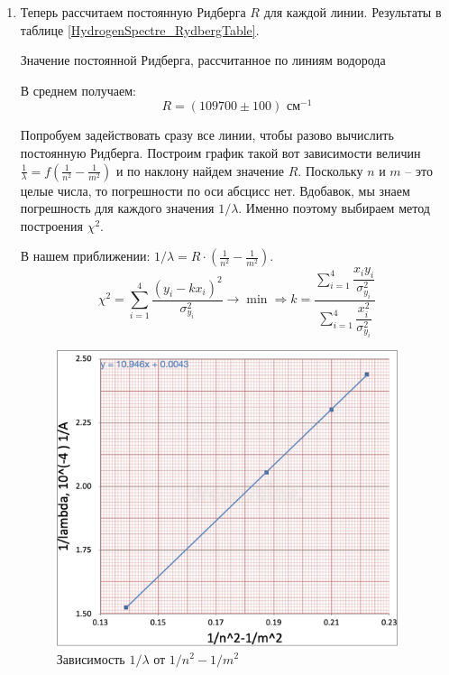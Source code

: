 \documentclass[12pt,a4paper]{article}
\begin{document}
\begin{enumerate}
	\item Теперь рассчитаем постоянную Ридберга $R$ для каждой линии. Результаты в таблице \ref{HydrogenSpectre_RydbergTable}.

     \begin{table}[h!]
       \centering
       \footnotesize
       
       \caption{Значение постоянной Ридберга, рассчитанное по линиям водорода}
       \label{HydrogenSpectre_RydbergTable}
    \end{table}
	
	В среднем получаем:
	\begin{equation*}
		\boxed{R = (109700 \pm 100) \text{ см}^{-1}}  \iffalse 117 \fi
	\end{equation*}

	Попробуем задействовать сразу все линии, чтобы разово вычислить постоянную Ридберга.
	Построим график такой вот зависимости величин $\frac{1}{\lambda} = f\left(\frac{1}{n^2} - \frac{1}{m^2}\right)$ и по наклону найдем значение $R$. Поскольку $n$ и $m$ -- это целые числа, то погрешности по оси абсцисс нет. Вдобавок, мы знаем погрешность для каждого значения $1/\lambda$. Именно поэтому выбираем метод построения $\chi^2$.

	В нашем приближении: $1/\lambda = R \cdot \left(\frac{1}{n^2} - \frac{1}{m^2}\right)$.
	\begin{equation*}
		\chi^2 = \sum\limits_{i = 1}^4 \frac{(y_i - kx_i)^2}{\sigma_{y_i}^2} \rightarrow \min \Longrightarrow k = \dfrac{\sum\limits_{i = 1}^4 \dfrac{x_i y_i}{\sigma_{y_i}^2}}{\sum\limits_{i = 1}^4 \dfrac{x_i^2}{\sigma_{y_i}^2}}
	\end{equation*}

	\begin{figure}[h!]
		\centering
		\includegraphics[width=10cm]{src/line.png}
		\caption{Зависимость $1/\lambda$ от $1/n^2 - 1/m^2$}
	\end{figure}


\end{enumerate}
\end{document}
